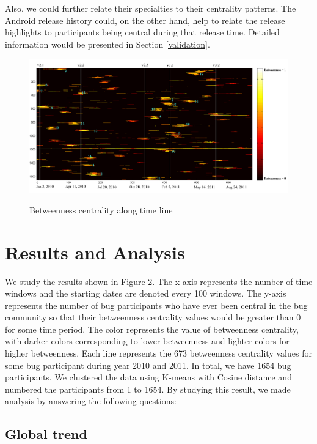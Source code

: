 \documentclass[10pt, conference, compsocconf]{IEEEtran}
\begin{document}
Also, we could further relate their specialties to their centrality
patterns. The Android release history could, on the other hand, help
to relate the release highlights to participants being central during
that release time. Detailed information would be presented in Section
\ref{validation}. 


\begin{figure}[ht]
\centering
\includegraphics[width=18cm]{result.pdf}
\label{result}
\caption{Betweenness centrality along time line}
\end{figure}

\section{Results and Analysis}
\label{results}

We study the results shown in Figure 2. The x-axis represents the
number of time windows and the starting dates are denoted every 100
windows. The y-axis represents the number of bug participants who have
ever been central in the bug community so that their betweenness
centrality values would be greater than 0 for some time period. The
color represents the value of betweenness centrality, with darker
colors corresponding to lower betweenness and lighter colors for
higher betweenness. Each line represents the 673 betweenness
centrality values for some bug participant during year 2010 and
2011. In total, we have 1654 bug participants. We clustered the data
using K-means with Cosine distance and numbered the participants from
1 to 1654. By studying this result, we made analysis by answering the
following questions:


\subsection{Global trend}
\end{document}
